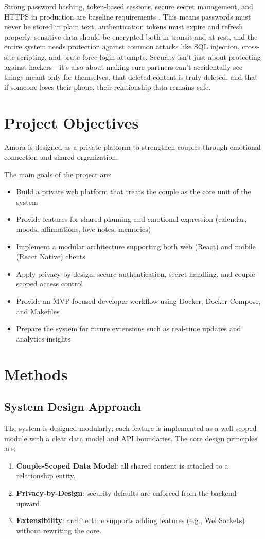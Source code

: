 \documentclass[sigconf, authorversion, nonacm, margin=0.75in]{acmart}
\begin{document}
Strong password hashing, token-based sessions, secure secret management, and HTTPS in production are baseline requirements \cite{owasp_authentication}. This means passwords must never be stored in plain text, authentication tokens must expire and refresh properly, sensitive data should be encrypted both in transit and at rest, and the entire system needs protection against common attacks like SQL injection, cross-site scripting, and brute force login attempts. Security isn't just about protecting against hackers—it's also about making sure partners can't accidentally see things meant only for themselves, that deleted content is truly deleted, and that if someone loses their phone, their relationship data remains safe.

\section{Project Objectives}
Amora is designed as a private platform to strengthen couples through emotional connection and shared organization.

The main goals of the project are:
\begin{itemize}
    \item Build a private web platform that treats the couple as the core unit of the system
    \item Provide features for shared planning and emotional expression (calendar, moods, affirmations, love notes, memories)
    \item Implement a modular architecture supporting both web (React) and mobile (React Native) clients
    \item Apply privacy-by-design: secure authentication, secret handling, and couple-scoped access control
    \item Provide an MVP-focused developer workflow using Docker, Docker Compose, and Makefiles
    \item Prepare the system for future extensions such as real-time updates and analytics insights
\end{itemize}

\section{Methods}

\subsection{System Design Approach}
The system is designed modularly: each feature is implemented as a well-scoped module with a clear data model and API boundaries. The core design principles are:
\begin{enumerate}
    \item \textbf{Couple-Scoped Data Model}: all shared content is attached to a relationship entity.
    \item \textbf{Privacy-by-Design}: security defaults are enforced from the backend upward.
    \item \textbf{Extensibility}: architecture supports adding features (e.g., WebSockets) without rewriting the core.
\end{enumerate}
\end{document}
